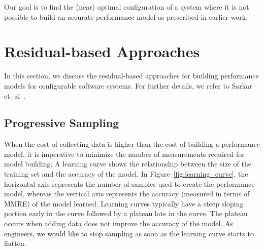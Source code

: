  Our goal is to find the (near) optimal configuration of a system where it is not possible to build an accurate performance model as prescribed in earlier work.

\section{Residual-based Approaches}\label{sec:residual}

In this section, we discuss the residual-based approaches for building performance models for configurable software systems. For further details, we refer to Sarkar et. al~\cite{sarkar2015cost}.




\subsection{Progressive Sampling}
When the cost of collecting data is higher than the cost of building a performance model, it is imperative to minimize the number of measurements required for model building. A learning curve shows the relationship between the size of the training set and the accuracy of the model. In Figure~\ref{fig:learning_curve}, the horizontal axis represents the number of samples used to create the performance model, whereas the vertical axis represents the accuracy (measured in terms of MMRE) of the model learned. 
Learning curves typically have a steep sloping portion early in the curve followed by a plateau late in the curve. The plateau occurs when adding data does not improve the accuracy of the model. As engineers, we would like to stop sampling as soon as the learning curve starts to flatten.




